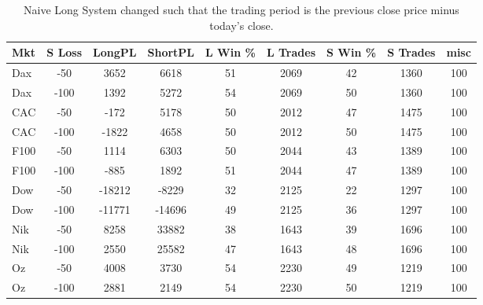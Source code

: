 \begin{table}[ht]
\centering
\caption[Naive Long System - Close to Close]{Naive Long System changed such that the trading period is the previous close price minus today's close.} 
\label{tab:sma_results_Sloss}
\begin{tabular}{lcccccccc}
  \toprule Mkt & S Loss & LongPL & ShortPL & L Win \% & L Trades & S Win \% & S Trades & misc \\ 
  \midrule Dax & -50 & 3652 & 6618 & 51 & 2069 & 42 & 1360 & 100 \\ 
  Dax & -100 & 1392 & 5272 & 54 & 2069 & 50 & 1360 & 100 \\ 
  CAC & -50 & -172 & 5178 & 50 & 2012 & 47 & 1475 & 100 \\ 
  CAC & -100 & -1822 & 4658 & 50 & 2012 & 50 & 1475 & 100 \\ 
  F100 & -50 & 1114 & 6303 & 50 & 2044 & 43 & 1389 & 100 \\ 
  F100 & -100 & -885 & 1892 & 51 & 2044 & 47 & 1389 & 100 \\ 
  Dow & -50 & -18212 & -8229 & 32 & 2125 & 22 & 1297 & 100 \\ 
  Dow & -100 & -11771 & -14696 & 49 & 2125 & 36 & 1297 & 100 \\ 
  Nik & -50 & 8258 & 33882 & 38 & 1643 & 39 & 1696 & 100 \\ 
  Nik & -100 & 2550 & 25582 & 47 & 1643 & 48 & 1696 & 100 \\ 
  Oz & -50 & 4008 & 3730 & 54 & 2230 & 49 & 1219 & 100 \\ 
  Oz & -100 & 2881 & 2149 & 54 & 2230 & 50 & 1219 & 100 \\ 
   \bottomrule \end{tabular}
\end{table}

